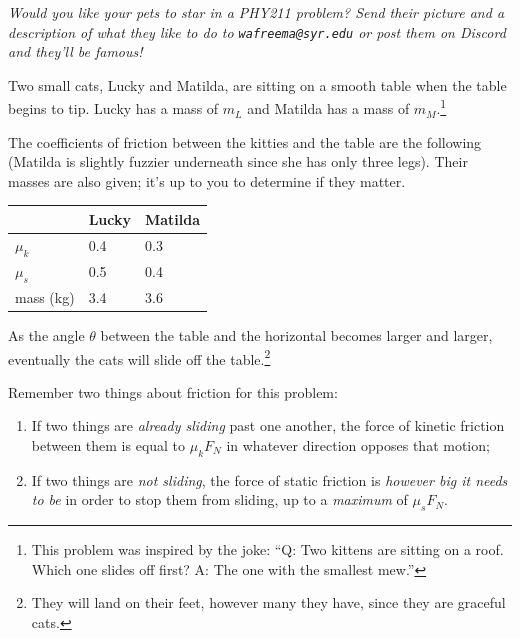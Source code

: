 \documentclass[12pt]{article}
\begin{document}
\Large
\centerline{}
\normalsize
\centerline{}

\begin{center}
{\it Would you like your pets to star in a PHY211 problem? Send their picture and a description of what they like to do to {\tt wafreema@syr.edu} or post them on Discord and they'll be famous!}
\end{center}


Two small cats, Lucky and Matilda, are sitting on a smooth table when the table begins to tip. Lucky has a mass of $m_L$ and Matilda has a mass of $m_M$.\footnote{This problem was inspired by the joke: ``Q: Two kittens are sitting on a roof. Which one slides off first? A: The one with the smallest mew.''}

\begin{minipage}{0.6\textwidth}
The coefficients of friction between the kitties and the table are the following (Matilda is slightly fuzzier underneath since she has only three legs). Their masses are also
given; it's up to you to determine if they matter.
\end{minipage}\hspace{0.1\textwidth}
\begin{minipage}{0.3\textwidth}
\begin{tabular}{|l|l|l|}
\hline
        & Lucky & Matilda \\ \hline
$\mu_k$ & 0.4  & 0.3  \\ \hline
$\mu_s$ & 0.5  & 0.4  \\ \hline
mass (kg) & 3.4 & 3.6 \\ \hline
\end{tabular}
\end{minipage}

As the angle $\theta$ between the table and the horizontal becomes larger and larger, eventually the cats will slide off the 
table.\footnote{They will land on their feet, however many they have, since they are graceful cats.}

Remember two things about friction for this problem:

\begin{enumerate}
\item If two things are {\it already sliding} past one another, the force of kinetic friction between them is equal to $\mu_k F_N$ in whatever direction opposes that motion;
\item If two things are {\it not sliding}, the force of static friction is {\it however big it needs to be} in order to stop
them from sliding, up to a {\it maximum} of $\mu_s F_N$.
\end{enumerate}
\end{document}
